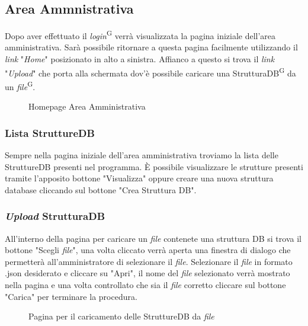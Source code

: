 \documentclass[5pt]{article}
\begin{document}
	    \subsection{Area Ammnistrativa}
	    Dopo aver effettuato il \textit{login}\textsuperscript{G} verrà visualizzata la pagina iniziale dell'area amministrativa. Sarà possibile ritornare a questa pagina facilmente utilizzando il \textit{link} "\textit{Home}" posizionato in alto a sinistra. Affianco a questo si trova il \textit{link} "\textit{Upload}" che porta alla schermata dov'è possibile caricare una StrutturaDB\textsuperscript{G} da un \textit{file}\textsuperscript{G}.
	    \begin{figure}[ht]
	    	\centering
	    	\caption{Homepage Area Amministrativa}
	    \end{figure}
	    
	    \subsubsection{Lista StruttureDB}
	    Sempre nella pagina iniziale dell'area amministrativa troviamo la lista delle StruttureDB presenti nel programma. È possibile visualizzare le strutture presenti tramite l'apposito bottone "Visualizza" oppure creare una nuova struttura database cliccando sul bottone "Crea Struttura DB". 
	    
	    \subsubsection{\textit{Upload} StrutturaDB}
	    All'interno della pagina per caricare un \textit{file} contenete una struttura DB si trova il bottone "Scegli \textit{file}", una volta cliccato verrà aperta una finestra di dialogo che permetterà all'amministratore di selezionare il \textit{file}. Selezionare il \textit{file} in formato .json desiderato e cliccare su "Apri", il nome del \textit{file} selezionato verrà mostrato nella pagina e una volta controllato che sia il \textit{file} corretto cliccare sul bottone "Carica" per terminare la procedura.
	    \begin{figure}[h]
	    	\centering
	    	\caption{Pagina per il caricamento delle StruttureDB da \textit{file}}
	    \end{figure}
	    
\end{document}
